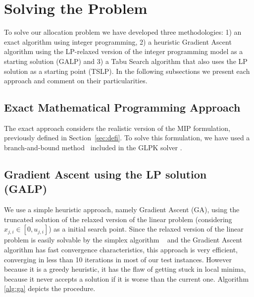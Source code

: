 \section{Solving the Problem}
\label{sec:alter}

To solve our allocation problem we have developed three methodologies: 1) an exact algorithm
using integer programming, 2) a heuristic Gradient Ascent algorithm using the LP-relaxed version of the integer
programming model as a starting solution (GALP) and 3) a Tabu Search
algorithm that also uses the LP solution as a starting point (TSLP). In the following subsections we present each approach and comment on their particularities.

%
%
%

\subsection{Exact Mathematical Programming Approach}
The exact approach considers the realistic version of the 
MIP formulation, previously defined in Section~\ref{sec:defi}.
To solve this formulation, we have used a branch-and-bound method~\cite{lawler1966branch}
included in the GLPK solver \cite{GLPK}.

\subsection{Gradient Ascent using the LP solution (GALP)}
We use a simple heuristic approach, namely Gradient Ascent (GA), using
the truncated solution of the relaxed version of the linear problem (considering $x_{j,i} \in [0,u_{j,i}]$) as a initial search point.
Since the relaxed version of the linear problem is easily solvable by the simplex 
algorithm ~\cite{dantzig1955generalized} and the Gradient Ascent algorithm has 
fast convergence characteristics, this approach is very efficient, 
converging in less than 10 iterations in most of our test instances. 
However because it is a greedy heuristic, it has the flaw of getting stuck in local minima,
because it never accepts a solution if it is worse than the current one.
Algorithm \ref{alg:ga} depicts the procedure.

